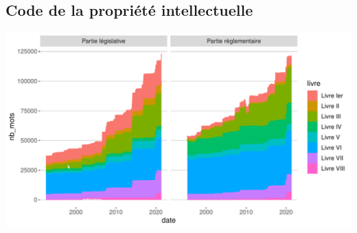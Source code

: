 \documentclass[
  oneside]{book}
\begin{document}
\hypertarget{code-de-la-propriuxe9tuxe9-intellectuelle}{%
\subsection{Code de la propriété intellectuelle}\label{code-de-la-propriuxe9tuxe9-intellectuelle}}

\includegraphics{05-images_files/figure-latex/pi.livres-1.pdf}

  
\end{document}
